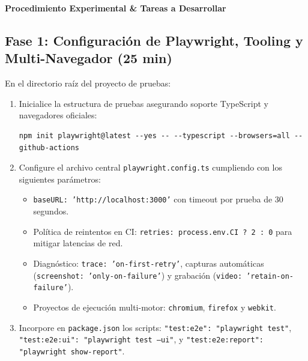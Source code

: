 \documentclass[10pt,letterpaper]{article}
\newcommand{\sectionBadge}[1]{%
  \refstepcounter{section}%
  \vspace{0.16cm}%
  \noindent%
  \colorbox{icesiBlue}{\color{white}\rule[-0.08cm]{0pt}{0.42cm}\hspace{0.16cm}\textbf{\normalsize \thesection}\hspace{0.16cm}}%
  \hspace{0.18cm}%
  {\fontsize{9.5}{12}\selectfont\textbf{\color{icesiDark}#1}}\\[-0.10cm]%
  \noindent{\color{icesiDark}\rule{\textwidth}{0.8pt}}\vspace{0.06cm}%
}
\begin{document}
\newpage

\sectionBadge{Procedimiento Experimental \& Tareas a Desarrollar}

\subsection{Fase 1: Configuración de Playwright, Tooling y Multi-Navegador (25 min)}
En el directorio raíz del proyecto de pruebas:
\begin{enumerate}[leftmargin=*,label=\textbf{\alph*)},itemsep=1.5pt,topsep=1.5pt]
  \item Inicialice la estructura de pruebas asegurando soporte TypeScript y navegadores oficiales:
  \begin{lstlisting}[style=bashstyle]
npm init playwright@latest --yes -- --typescript --browsers=all --github-actions
  \end{lstlisting}
  \item Configure el archivo central \texttt{playwright.config.ts} cumpliendo con los siguientes parámetros:
  \begin{itemize}[itemsep=1pt]
    \item \texttt{baseURL: 'http://localhost:3000'} con timeout por prueba de 30 segundos.
    \item Política de reintentos en CI: \texttt{retries: process.env.CI ? 2 : 0} para mitigar latencias de red.
    \item Diagnóstico: \texttt{trace: 'on-first-retry'}, capturas automáticas (\texttt{screenshot: 'only-on-failure'}) y grabación (\texttt{video: 'retain-on-failure'}).
    \item Proyectos de ejecución multi-motor: \texttt{chromium}, \texttt{firefox} y \texttt{webkit}.
  \end{itemize}
  \item Incorpore en \texttt{package.json} los scripts: \texttt{"test:e2e": "playwright test"}, \texttt{"test:e2e:ui": "playwright test --ui"}, y \texttt{"test:e2e:report": "playwright show-report"}.
\end{enumerate}
\end{document}
